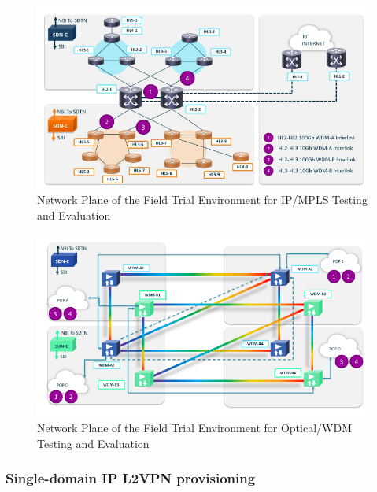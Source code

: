 \documentclass[a4paper,fleqn]{cas-dc}
\begin{document}

\begin{figure}
	\centering
		\includegraphics[scale=1]{figs/field_trial_environment_ip.pdf}
	\caption{Network Plane of the Field Trial Environment for IP/MPLS Testing and Evaluation}
	\label{FIG:field_trial_ip}
\end{figure}

\begin{figure}
	\centering
		\includegraphics[scale=1]{figs/field_trial_environment_optical.pdf}
	\caption{Network Plane of the Field Trial Environment for Optical/WDM Testing and Evaluation}
	\label{FIG:field_trial_optical}
\end{figure}

\subsubsection{Single-domain IP L2VPN provisioning}
\label{section:single-l2nm}
\end{document}
